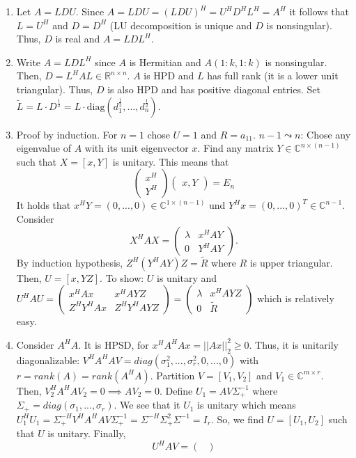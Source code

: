 \documentclass[a4paper, landscape,twocolumn,fontsize=9pt]{scrartcl}
\begin{document}
\begin{enumerate}
    \item Let $A = LDU$. Since $A = LDU = (LDU)^H = U^H D^H L^H = A^H$ it follows that $L = U^H$ and $D = D^H$ (LU decomposition is unique and $D$ is nonsingular). Thus, $D$ is real and $A = LDL^H$.
    \item Write $A = LDL^H$ since $A$ is Hermitian and $A(1:k, 1:k)$ is nonsingular. Then, $D = L^HAL \in \mathbb R^{n \times n}$. $A$ is HPD and $L$ has full rank (it is a lower unit triangular). Thus, $D$ is also HPD and has positive diagonal entries. Set $\tilde L = L \cdot D^{\frac{1}{2}} = L \cdot \mathrm{diag}(d_{1}^{\frac{1}{2}}, ..., d_n^{\frac{1}{2}})$.
    \item Proof by induction. For $n = 1$ chose $U = 1$ and $R = a_{11}$. $n-1 \leadsto n$: Chose any eigenvalue of $A$ with its unit eigenvector $x$. Find any matrix $Y \in \mathbb C^{n \times (n-1)}$ such that $X = [x,Y]$ is unitary. This means that
    \[
    	\begin{pmatrix}
    		x^H \\ Y^H
    	\end{pmatrix} \begin{pmatrix}
    		x, Y
    	\end{pmatrix} = E_n
    \]
    It holds that $x^HY = (0,...,0) \in \mathbb C^{1 \times (n-1)}$ und $Y^Hx = (0,...,0)^T \in \mathbb C^{n-1}$. Consider 
    \[
    	X^HAX = \begin{pmatrix}
    		\lambda & x^HAY \\ 0 & Y^HAY
    	\end{pmatrix}.
    \]
    By induction hypothesis, $Z^H(Y^HAY)Z = \tilde R$ where $R$ is upper triangular. Then, $U = [x, YZ]$. To show: $U$ is unitary and $U^HAU = \begin{pmatrix}
    	x^HAx & x^HAYZ \\ Z^HY^HAx & Z^HY^HAYZ
    \end{pmatrix} = \begin{pmatrix}
    	\lambda & x^HAYZ \\ 0 & \tilde R
    \end{pmatrix}$ which is relatively easy.
    \item Consider $A^HA$. It is HPSD, for $x^HA^HAx = ||Ax||^2_2 \geq 0$. Thus, it is unitarily diagonalizable: $V^H A^HAV = diag(\sigma_1^2,...,\sigma_r^2,0,...,0)$ with \underline{$r = rank(A) = rank(A^HA)$}. Partition $V = [V_1,V_2]$ and $V_1 \in \mathbb C^{m \times r}$. Then, $V_2^HA^HAV_2 = 0 \implies AV_2 = 0$. Define $U_1 = AV\Sigma^{-1}_+$ where $\Sigma_+ = diag(\sigma_1,...,\sigma_r)$. We see that it $U_1$ is unitary which means $U_1^HU_1 = \Sigma_+^{-H}V^HA^HAV\Sigma_+^{-1} = \Sigma^{-H} \Sigma_+^2 \Sigma^{-1} = I_r$. So, we find $U = [U_1,U_2]$ such that $U$ is unitary. Finally, $$U^H A V = \begin{pmatrix}

\end{pmatrix}$$
\end{enumerate}
\end{document}
